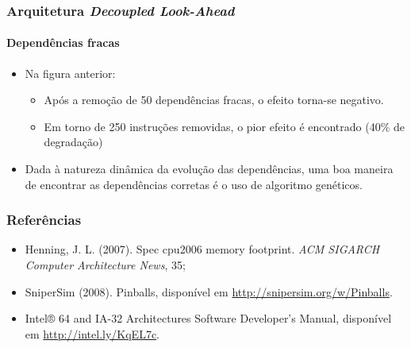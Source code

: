 \documentclass[10pt]{beamer}
\begin{document}
\begin{frame}
\frametitle{Arquitetura \textit{Decoupled Look-Ahead}}
\framesubtitle{Dependências fracas}

\begin{itemize}
 \item Na figura anterior:
 \begin{itemize}
   \item Após a remoção de 50 dependências fracas, o efeito torna-se negativo.
   \item Em torno de 250 instruções removidas, o pior efeito é encontrado (40\%
   de degradação)
 \end{itemize}
 
 \vspace{12pt}
 
 \item Dada à natureza dinâmica da evolução das dependências, uma boa maneira
 de encontrar as dependências corretas é o uso de algoritmo genéticos.
\end{itemize}
\end{frame}

\begin{frame}
\frametitle{Referências}

\begin{itemize}
  \item Henning, J. L. (2007). Spec cpu2006 memory footprint. \textit{ACM
  SIGARCH Computer Architecture News}, 35;
  \vspace{14pt}
  \item SniperSim (2008). Pinballs, disponível em
  \url{http://snipersim.org/w/Pinballs}.
  \item Intel® 64 and IA-32 Architectures
Software Developer’s Manual, disponível em \url{http://intel.ly/KqEL7c}.
\end{itemize}

\end{frame}
\end{document}
